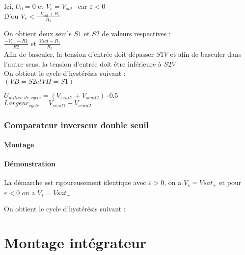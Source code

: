 Ici, $U_0=0$ et $V_s=V_{sat_-}$ car $\varepsilon<0$ \\

D'ou $V_e < \frac{-V_{sat} + R_1}{R_2}$



On obtient deux seuils $S1$ et $S2$ de valeurs respectives : \\


$\frac{-V_{sat}+R1}{R2}$ et $\frac{Vsat - R_1}{R_2}$ \\



Afin de basculer, la tension d’entrée doit dépasser $S1 V$ et afin de basculer dans l’autre sens, la tension d’entrée doit être inférieure à $S2 V$ \\


On obtient le cycle d’hystérésis suivant : \\

$(VB=S2 et VH=S1)$




$U_{milieu\_de\_cycle}=(V_{seuil1}+V_{seuil2}) \cdot 0.5$ \\
$Largeur_{cycle}=V_{seuil1}-V_{seuil2}$


\subsection{Comparateur inverseur double seuil}

\subsubsection{Montage}


\subsubsection{Démonstration}

La démarche est rigoureusement identique avec $\varepsilon>0$, on a $V_s=Vsat_+$
et pour  $\varepsilon<0$ on a $V_s=Vsat_-$

On obtient le cycle d’hystérésis suivant : \\




\chapter{Montage intégrateur}
